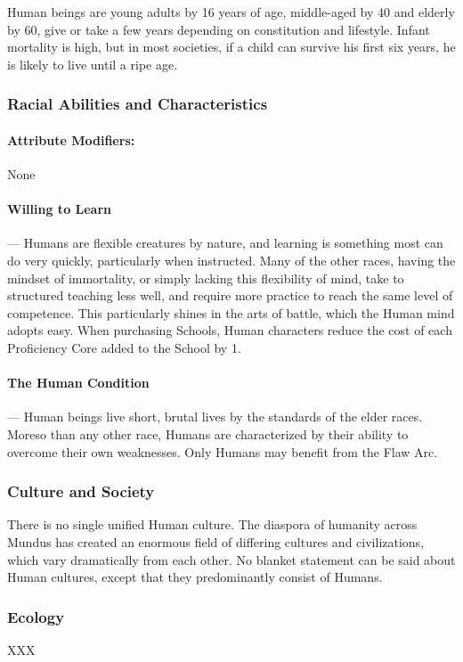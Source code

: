\documentclass[oneside,11pt,english]{book}
\begin{document}
Human beings are young adults by 16 years of age, middle-aged by 40 and elderly by 60, give or take a 
few years depending on constitution and lifestyle. Infant mortality is high, but in most societies, if a child can survive his first six years, he is likely to live until a ripe age.


\subsubsection*{Racial Abilities and Characteristics} 
\paragraph{Attribute Modifiers:} None
\paragraph{\label{par:Willing to Learn}Willing to Learn}---\quad
Humans are flexible creatures by nature, and learning is something most can do very quickly, 
particularly when instructed. Many of the other races, having the mindset of immortality, or 
simply lacking this flexibility of mind, take to structured teaching less well, and require more 
practice to reach the same level of competence. This particularly shines in the arts of battle, which 
the Human mind adopts easy. When purchasing Schools, Human characters reduce the cost of 
each Proficiency Core added to the School by 1. 


\paragraph{\label{par:The Human Condition}The Human Condition}---\quad
Human beings live short, brutal lives by the standards of the elder races. Moreso than any other 
race, Humans are characterized by their ability to overcome their own weaknesses. Only Humans 
may benefit from the Flaw Arc. 
\subsubsection*{Culture and Society} 
There is no single unified Human culture. The diaspora of humanity across Mundus has created an 
enormous field of differing cultures and civilizations, which vary dramatically from each other. No blanket statement can be said about Human cultures, except that they predominantly consist of Humans.
\subsubsection*{Ecology} 
XXX 
\end{document}
